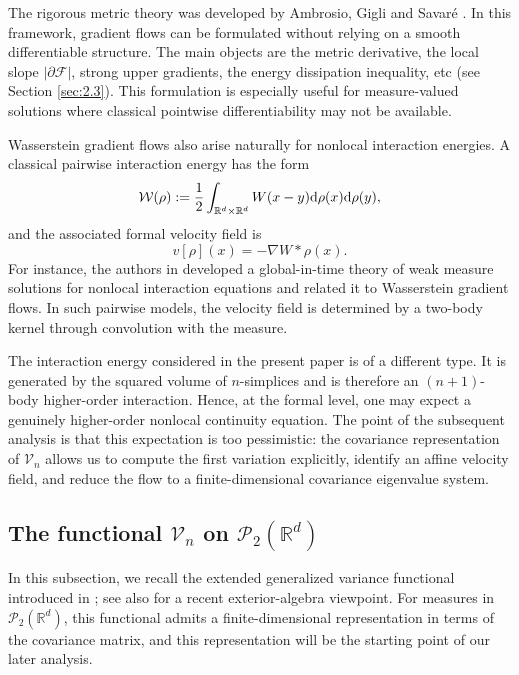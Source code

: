 \documentclass[11pt,reqno]{amsart}
\numberwithin{figure}{section}
\def\d {{\partial}}
\newcommand{\bbr}{\mathbb R}
\def\d{\mathrm{d}}
\renewcommand{\d}{  {\textup{d}} }
\begin{document}
The rigorous metric theory was developed by Ambrosio, Gigli and Savar\'e \cite{AGS2005}. In this framework, gradient flows can be formulated without relying on a smooth differentiable structure. The main objects are the metric derivative, the local slope $|\partial\mathcal F|$, strong upper gradients, the energy dissipation inequality, etc (see Section \ref{sec:2.3}). This formulation is especially useful for measure-valued solutions where classical pointwise differentiability may not be available. 




Wasserstein gradient flows also arise naturally for nonlocal interaction energies. A classical
pairwise interaction energy has the form
\[
\mathcal W(\rho) := \frac12\int_{\bbr^d\times \bbr^d}W(x-y) \d\rho(x) \d\rho(y),
\]
and the associated formal velocity field is
\[
v[\rho](x)=-\nabla W*\rho(x).
\]
For instance, the authors in \cite{carrillo2011global} developed a global-in-time theory
of weak measure solutions for nonlocal interaction equations and related it to Wasserstein
gradient flows. In such pairwise models, the velocity field is determined by a two-body
kernel through convolution with the measure.

The interaction energy considered in the present paper is of a different type. It is generated
by the squared volume of $n$-simplices and is therefore an $(n+1)$-body higher-order
interaction. Hence, at the formal level, one may expect a genuinely higher-order nonlocal
continuity equation. The point of the subsequent analysis is that this expectation is too
pessimistic: the covariance representation of $\mathcal V_n$ allows us to compute the first
variation explicitly, identify an affine velocity field, and reduce the flow to a finite-dimensional
covariance eigenvalue system.

 




\subsection{The functional $\mathcal V_n$ on $\mathcal P_2(\mathbb R^d)$}

In this subsection, we recall the extended generalized variance functional introduced in \cite{pronzato2017extended}; see also \cite{WZ} for a recent exterior-algebra viewpoint. For measures in $\mathcal P_2(\bbr^d)$, this functional admits a finite-dimensional representation in terms of the covariance matrix, and this representation will be the starting point of our later analysis.
\end{document}
